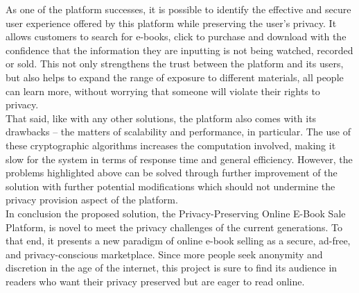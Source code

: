 \documentclass[12pt]{article}
\begin{document}
As one of the platform successes, it is possible to identify the effective and secure user experience offered by this platform while preserving the user’s privacy. It allows customers to search for e-books, click to purchase and download with the confidence that the information they are inputting is not being watched, recorded or sold. This not only strengthens the trust between the platform and its users, but also helps to expand the range of exposure to different materials, all people can learn more, without worrying that someone will violate their rights to privacy. \\

That said, like with any other solutions, the platform also comes with its drawbacks – the matters of scalability and performance, in particular. The use of these cryptographic algorithms increases the computation involved, making it slow for the system in terms of response time and general efficiency. However, the problems highlighted above can be solved through further improvement of the solution with further potential modifications which should not undermine the privacy provision aspect of the platform. \\

In conclusion the proposed solution, the Privacy-Preserving Online E-Book Sale Platform, is novel to meet the privacy challenges of the current generations. To that end, it presents a new paradigm of online e-book selling as a secure, ad-free, and privacy-conscious marketplace. Since more people seek anonymity and discretion in the age of the internet, this project is sure to find its audience in readers who want their privacy preserved but are eager to read online. 

 \pagebreak

 
 
\end{document}
